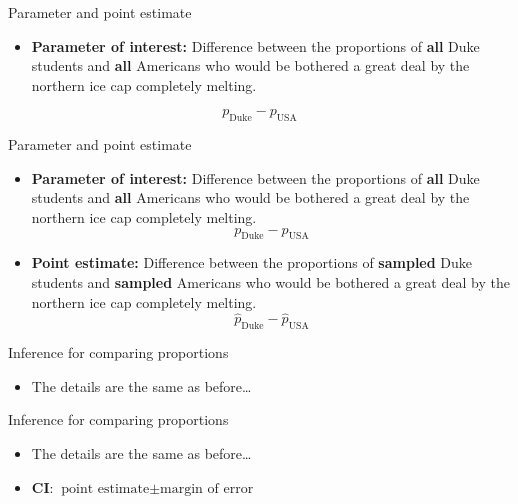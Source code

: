 \documentclass[
  ignorenonframetext,
]{beamer}
\providecommand{\tightlist}{%
  \setlength{\itemsep}{0pt}\setlength{\parskip}{0pt}}
\begin{document}
\begin{frame}{Parameter and point estimate}
\protect\hypertarget{parameter-and-point-estimate}{}

\begin{itemize}
\tightlist
\item
  \textbf{Parameter of interest:} Difference between the proportions of
  \textbf{all} Duke students and \textbf{all} Americans who would be
  bothered a great deal by the northern ice cap completely melting.
\end{itemize}

\[
p_\text{Duke} - p_\text{USA}
\]

\end{frame}

\begin{frame}{Parameter and point estimate}
\protect\hypertarget{parameter-and-point-estimate-1}{}

\begin{itemize}
\tightlist
\item
  \textbf{Parameter of interest:} Difference between the proportions of
  \textbf{all} Duke students and \textbf{all} Americans who would be
  bothered a great deal by the northern ice cap completely melting. \[
  p_\text{Duke} - p_\text{USA}
  \]
\item
  \textbf{Point estimate:} Difference between the proportions of
  \textbf{sampled} Duke students and \textbf{sampled} Americans who
  would be bothered a great deal by the northern ice cap completely
  melting. \[
  \hat{p}_\text{Duke} - \hat{p}_\text{USA}
  \]
\end{itemize}

\end{frame}

\begin{frame}{Inference for comparing proportions}
\protect\hypertarget{inference-for-comparing-proportions}{}

\begin{itemize}
\tightlist
\item
  The details are the same as before\ldots{}
\end{itemize}

\end{frame}

\begin{frame}{Inference for comparing proportions}
\protect\hypertarget{inference-for-comparing-proportions-1}{}

\begin{itemize}
\tightlist
\item
  The details are the same as before\ldots{}
\item
  \textbf{CI}: \(\text{point estimate} \pm \text{margin of error}\)
\end{itemize}

\end{frame}
\end{document}
